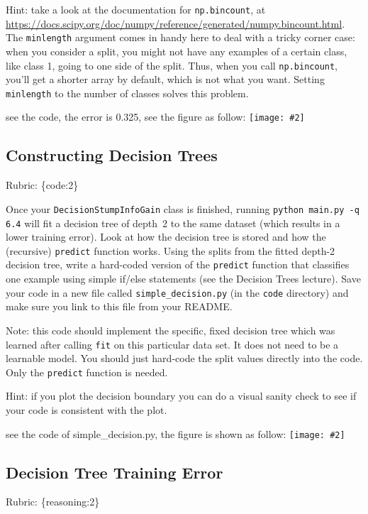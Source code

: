 \documentclass{article}
\def\rubric#1{\gre{Rubric: \{#1\}}}{}
\def\blu#1{{\color{blu}#1}}
\def\gre#1{{\color{gre}#1}}
\def\red#1{{\color{red}#1}}
\newcommand{\fig}[2]{\texttt{[image: \#2]}}
\begin{document}
Hint: take a look at the documentation for \texttt{np.bincount}, at \\
\url{https://docs.scipy.org/doc/numpy/reference/generated/numpy.bincount.html}.
The \texttt{minlength} argument comes in handy here to deal with a tricky corner case:
when you consider a split, you might not have any examples of a certain class, like class 1,
going to one side of the split. Thus, when you call \texttt{np.bincount}, you'll get
a shorter array by default, which is not what you want. Setting \texttt{minlength} to the
number of classes solves this problem.

\red{see the code, the error is 0.325, see the figure as follow:
}
\fig{1}{../figs/q6_3_decisionBoundary}

\subsection{Constructing Decision Trees}
\rubric{code:2}

Once your \texttt{DecisionStumpInfoGain} class is finished, running \texttt{python main.py -q 6.4} will fit
a decision tree of depth~2 to the same dataset (which results in a lower training error).
Look at how the decision tree is stored and how the (recursive) \texttt{predict} function works.
\blu{Using the splits from the fitted depth-2 decision tree, write a hard-coded version of the \texttt{predict}
function that classifies one example using simple if/else statements
(see the Decision Trees lecture).} Save your code in a new file called
\texttt{simple\string_decision.py} (in the \texttt{code} directory) and make sure you link to this file from your README.

Note: this code should implement the specific, fixed decision tree
which was learned after calling \texttt{fit} on this particular data set. It does not need to be a learnable model.
You should just hard-code the split values directly into the code. Only the \texttt{predict} function is needed.

Hint: if you plot the decision boundary you can do a visual sanity check to see if your code is consistent with the plot.

\red{
see the code of simple\_decision.py, the figure is shown as follow:
}
\fig{1}{../figs/q6_4_decisionBoundary}




\subsection{Decision Tree Training Error}
\rubric{reasoning:2}
\end{document}
